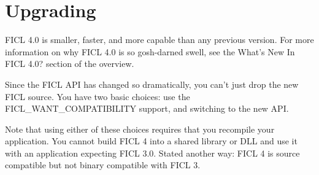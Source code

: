 \chapter{Upgrading}
FICL 4.0 is smaller, faster, and more capable than any previous version.
For more information on why FICL 4.0 is so gosh-darned swell, see the
What's New In FICL 4.0? section of the overview.

Since the FICL API has changed so dramatically, you can't just drop the
new FICL source. You have two basic choices: use the
FICL\_WANT\_COMPATIBILITY support, and switching to the new API.

Note that using either of these choices requires that you recompile your
application. You cannot build FICL 4 into a shared library or DLL and
use it with an application expecting FICL 3.0. Stated another way: FICL
4 is source compatible but not binary compatible with FICL 3.


